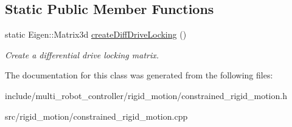 \subsection*{Static Public Member Functions}
\begin{DoxyCompactItemize}
\item 
static Eigen\+::\+Matrix3d \hyperlink{group__RigidMotion_gad4fb6e13815454559ec7e52b291489af}{create\+Diff\+Drive\+Locking} ()
\begin{DoxyCompactList}\small\item\em Create a differential drive locking matrix. \end{DoxyCompactList}\end{DoxyCompactItemize}


The documentation for this class was generated from the following files\+:\begin{DoxyCompactItemize}
\item 
include/multi\+\_\+robot\+\_\+controller/rigid\+\_\+motion/constrained\+\_\+rigid\+\_\+motion.\+h\item 
src/rigid\+\_\+motion/constrained\+\_\+rigid\+\_\+motion.\+cpp\end{DoxyCompactItemize}
